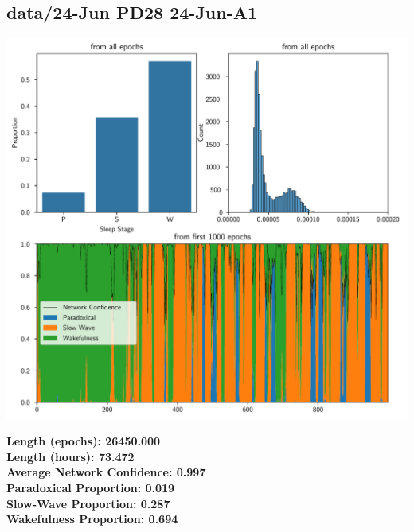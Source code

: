         \subsection*{ data/24-Jun PD28 24-Jun-A1 }
        \begin{center}
        \begin{adjustbox}{width=1\textwidth}
        \includegraphics[page=8]{figs.pdf}
        \end{adjustbox}
        \end{center}
        \large\textbf{Length (epochs): 26450.000}\\
        \textbf{Length (hours): 73.472}\\
        \textbf{Average Network Confidence: 0.997}\\
        \textbf{Paradoxical Proportion: 0.019}\\
        \textbf{Slow-Wave Proportion: 0.287}\\
        \textbf{Wakefulness Proportion: 0.694}\\
        

